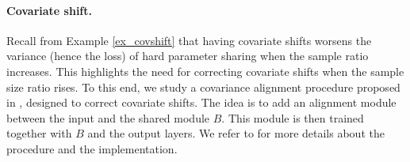 



\paragraph{Covariate shift.}
Recall from Example \ref{ex_covshift} that having covariate shifts worsens the variance (hence the loss) of hard parameter sharing when the sample ratio increases.
This highlights the need for correcting covariate shifts when the sample size ratio rises.
To this end, we study a covariance alignment procedure proposed in \citet{WZR20}, designed to correct covariate shifts.
The idea is to add an alignment module between the input and the shared module $B$.
This module is then trained together with $B$ and the output layers. We refer to \citet{WZR20} for more details about the procedure and the implementation.

